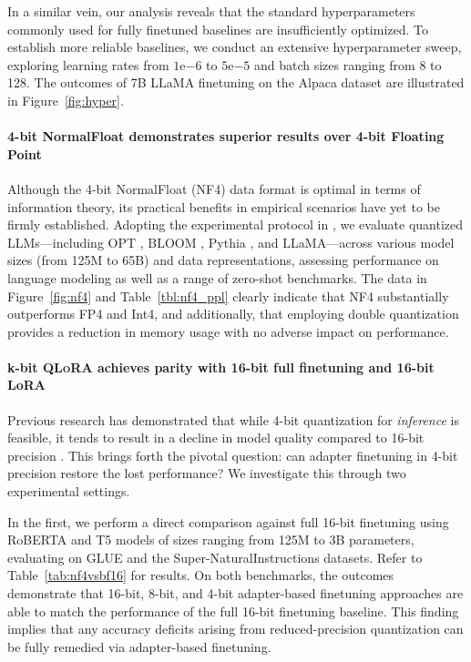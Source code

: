 In a similar vein, our analysis reveals that the standard hyperparameters commonly used for fully finetuned baselines are insufficiently optimized. To establish more reliable baselines, we conduct an extensive hyperparameter sweep, exploring learning rates from $1\mathrm{e}{-6}$ to $5\mathrm{e}{-5}$ and batch sizes ranging from 8 to 128. The outcomes of 7B LLaMA finetuning on the Alpaca dataset are illustrated in Figure~\ref{fig:hyper}.

\paragraph{4-bit NormalFloat demonstrates superior results over 4-bit Floating Point}

Although the 4-bit NormalFloat (NF4) data format is optimal in terms of information theory, its practical benefits in empirical scenarios have yet to be firmly established. Adopting the experimental protocol in \citet{dettmers2022case}, we evaluate quantized LLMs—including OPT \citep{zhang2022opt}, BLOOM \cite{scao2022bloom}, Pythia \cite{biderman2023pythia}, and LLaMA—across various model sizes (from 125M to 65B) and data representations, assessing performance on language modeling as well as a range of zero-shot benchmarks. The data in Figure~\ref{fig:nf4} and Table~\ref{tbl:nf4_ppl} clearly indicate that NF4 substantially outperforms FP4 and Int4, and additionally, that employing double quantization provides a reduction in memory usage with no adverse impact on performance.

\paragraph{k-bit \textsc{QLoRA} achieves parity with 16-bit full finetuning and 16-bit LoRA}

Previous research has demonstrated that while 4-bit quantization for \emph{inference} is feasible, it tends to result in a decline in model quality compared to 16-bit precision \citep{dettmers2022case,frantar2022gptq}. This brings forth the pivotal question: can adapter finetuning in 4-bit precision restore the lost performance? We investigate this through two experimental settings.

In the first, we perform a direct comparison against full 16-bit finetuning using RoBERTA and T5 models of sizes ranging from 125M to 3B parameters, evaluating on GLUE and the Super-NaturalInstructions datasets. Refer to Table~\ref{tab:nf4vsbf16} for results. On both benchmarks, the outcomes demonstrate that 16-bit, 8-bit, and 4-bit adapter-based finetuning approaches are able to match the performance of the full 16-bit finetuning baseline. This finding implies that any accuracy deficits arising from reduced-precision quantization can be fully remedied via adapter-based finetuning.

